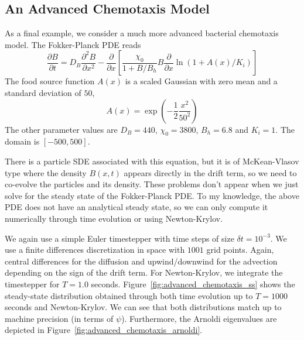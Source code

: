\documentclass{article}
\begin{document}
\subsection{An Advanced Chemotaxis Model}
As a final example, we consider a much more advanced bacterial chemotaxis model. The Fokker-Planck PDE reads
\begin{equation}
\frac{\partial B}{\partial t} = D_B \frac{\partial^2 B}{\partial x^2} - \frac{\partial}{\partial x} \left[ \frac{\chi_0}{1 + B/B_h} B \frac{\partial}{\partial x} \ln(1 + A(x)/K_i) \right]
\end{equation}
The food source function $A(x)$ is a scaled Gaussian with zero mean and a standard deviation of $50$, 
\begin{equation*}
    A(x) = \exp\left(-\frac{1}{2}\frac{x^2}{50^2}\right)
\end{equation*}
The other parameter values are $D_B = 440$, $\chi_0 = 3800$, $B_h = 6.8$ and $K_i = 1$. The domain is $[-500,500]$.

There is a particle SDE associated with this equation, but it is of McKean-Vlasov type where the density $B(x,t)$ appears directly in the drift term, so we need to co-evolve the particles and its density. These problems don't appear when we just solve for the steady state of the Fokker-Planck PDE. To my knowledge, the above PDE does not have an analytical steady state, so we can only compute it numerically through time evolution or using Newton-Krylov.

We again use a simple Euler timestepper with time steps of size $\delta t = 10^{-3}$. We use a finite differences discretization in space with $1001$ grid points. Again, central differences for the diffusion and upwind/downwind for the advection depending on the sign of the drift term. For Newton-Krylov, we integrate the timestepper for $T = 1.0$ seconds. Figure~\ref{fig:advanced_chemotaxis_ss} shows the steady-state distribution obtained through both time evolution up to $T = 1000$ seconds and Newton-Krylov. We can see that both distributions match up to machine precision (in terms of $\psi$). Furthermore, the Arnoldi eigenvalues are depicted in Figure~\ref{fig:advanced_chemotaxis_arnoldi}.
\end{document}

